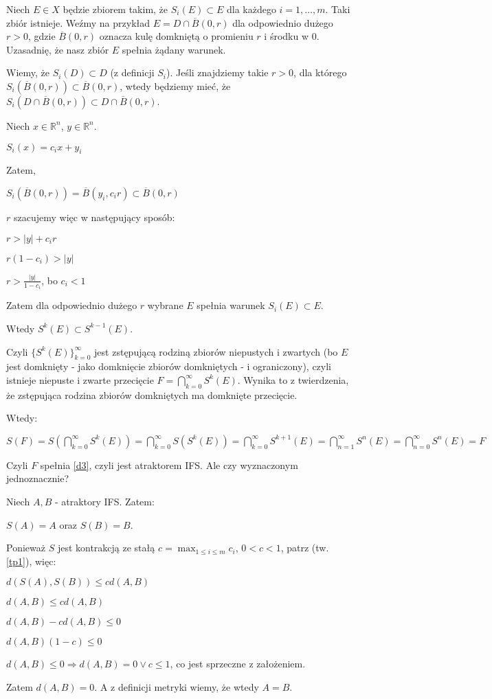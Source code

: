 \documentclass{mini}
\begin{document}
\begin{dow2}

Niech $E \in X$ będzie zbiorem takim, że $S_i(E) \subset E$ dla każdego $i=1,\ldots ,m$.
Taki zbiór istnieje. Weźmy na przykład $E=D \cap \overline{B}(0,r)$ dla odpowiednio dużego $r>0$, gdzie $\overline{B}(0,r)$ oznacza kulę domkniętą o promieniu $r$ i środku w $0$.
Uzasadnię, że nasz zbiór $E$ spełnia żądany warunek.

Wiemy, że $S_i(D) \subset D$ (z definicji $S_i$). Jeśli znajdziemy takie $r>0$, dla którego $S_i(\overline{B}(0,r)) \subset \overline{B}(0,r)$, wtedy będziemy mieć, że $S_i(D \cap \overline{B}(0,r)) \subset D \cap \overline{B}(0,r)$.

Niech $x \in \mathbb{R}^n$, $y \in \mathbb{R}^n$.

$S_i(x)=c_ix + y_i$

Zatem,

$S_i(\overline{B}(0,r))=\overline{B}(y_i,c_ir) \subset \overline{B}(0,r)$

$r$ szacujemy więc w następujący sposób:

$r> \vert y \vert + c_ir$

$r(1-c_i)>\vert y \vert$

$r>\frac{\vert y \vert}{1-c_i}$, bo $c_i<1$

Zatem dla odpowiednio dużego $r$ wybrane $E$ spełnia warunek $S_i(E) \subset E$.

Wtedy $S^k(E) \subset S^{k-1}(E)$.

Czyli $\lbrace S^k(E) \rbrace^{\infty}_{k=0}$ jest zstępującą rodziną zbiorów niepustych i zwartych (bo $E$ jest domknięty - jako domknięcie zbiorów domkniętych - i ograniczony), czyli istnieje niepuste i zwarte przecięcie $F = \bigcap^{\infty}_{k=0} S^k(E)$. Wynika to z twierdzenia, że zstępująca rodzina zbiorów domkniętych ma domknięte przecięcie.

Wtedy:

\mbox{$S(F)=S(\bigcap^{\infty}_{k=0} S^k(E))=\bigcap^{\infty}_{k=0} S(S^k(E))=\bigcap^{\infty}_{k=0} S^{k+1}(E)=\bigcap^{\infty}_{n=1} S^n(E)=\bigcap^{\infty}_{n=0} S^n(E)=F$}

Czyli $F$ spełnia \eqref{d3}, czyli jest atraktorem IFS. Ale czy wyznaczonym jednoznacznie?

Niech $A,B$ - atraktory IFS. Zatem:

$S(A)=A$ oraz $S(B)=B$.

Ponieważ $S$ jest kontrakcją ze stałą $c=\max_{1\leqslant i\leqslant m}{c_i}$, $0<c<1$, patrz  (tw.~ \ref{tp1}), więc:

$d(S(A),S(B))\leqslant cd(A,B)$

$d(A,B) \leqslant cd(A,B)$

$d(A,B)-cd(A,B)\leqslant 0$

$d(A,B)(1-c)\leqslant0$

$d(A,B)\leqslant 0 \Longrightarrow d(A,B)=0 \vee c\leqslant1$, co jest sprzeczne z założeniem.

Zatem $d(A,B)=0$. A z definicji metryki wiemy, że wtedy $A=B$.
\end{dow2}
\end{document}
